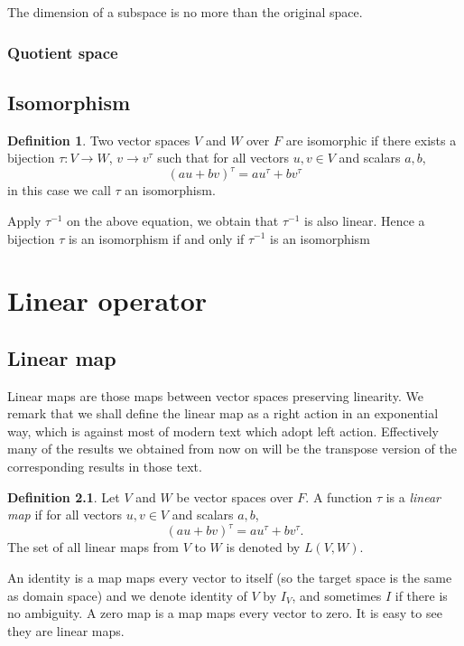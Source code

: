 \documentclass{amsbook}
\theoremstyle{definition}
\newtheorem{definition}[theorem]{Definition}
\theoremstyle{remark}
\numberwithin{section}{chapter}
\numberwithin{equation}{chapter}
\begin{document}
	
	The dimension of a subspace is no more than the original space.
	\subsection{Quotient space}
\section{Isomorphism}
\begin{definition}
	Two vector spaces $V$ and $W$ over $F$ are isomorphic if there exists a bijection $\tau \colon V \to W$, $v \to v^\tau$ such that for all vectors $u, v \in V$ and scalars $a, b$,
	\begin{equation*}
	(au + bv)^{\tau} = au^{\tau} + bv^{\tau}
	\end{equation*}
	in this case we call $\tau$ an isomorphism.
\end{definition}
Apply $\tau^{-1}$ on the above equation, we obtain that $\tau^{-1}$ is also linear. Hence a bijection $\tau$ is an isomorphism if and only if $\tau^{-1}$ is an isomorphism




\chapter{Linear operator}
\section{Linear map}
Linear maps are those maps between vector spaces preserving linearity. We remark that we shall define the linear map as a right action in an exponential way, which is against most of modern text which adopt left action. Effectively many of the results we obtained from now on will be the transpose version of the corresponding results in those text. 
\begin{definition}
	Let $V$ and $W$ be vector spaces over $F$. A function $\tau$ is a \emph{linear map} if for all vectors $u, v \in V$ and scalars $a, b$,
		\begin{equation*}
	(au + bv)^{\tau} = au^{\tau} + bv^{\tau}.
	\end{equation*}
	The set of all linear maps from $V$ to $W$ is denoted by $L(V, W)$.
\end{definition}
An identity is a map maps every vector to itself (so the target space is the same as domain space) and we denote identity of $V$ by $I_V$, and sometimes $I$ if there is no ambiguity. A zero map is a map maps every vector to zero. It is easy to see they are linear maps.
\end{document}
